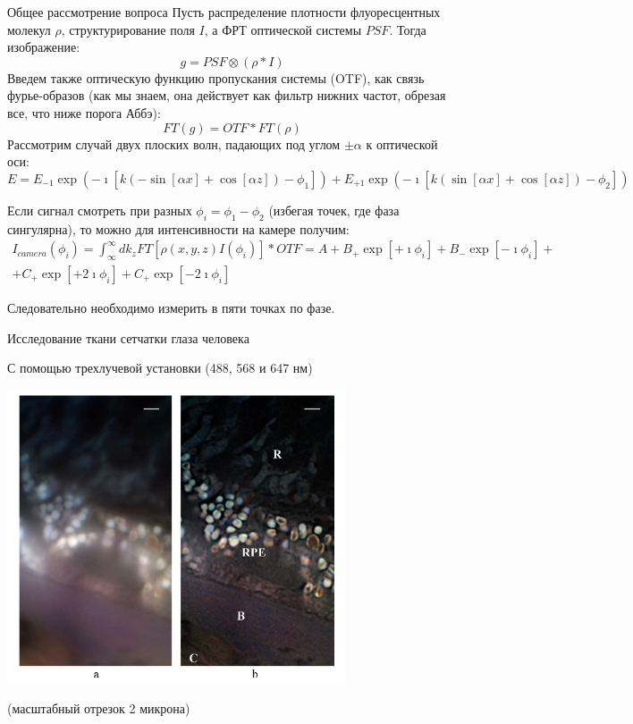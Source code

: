 \documentclass[9pt, compress, xcolor=table]{beamer}
\begin{document}
\begin{frame}{Общее рассмотрение вопроса}
{\small Пусть распределение плотности флуоресцентных молекул $\rho$, структурирование поля $I$, а ФРТ оптической системы $PSF$. Тогда изображение:}
\begin{equation*}
g=PSF\otimes(\rho*I)
\end{equation*}
{\small Введем также оптическую функцию пропускания системы (OTF), как связь фурье-образов (как мы знаем, она действует как фильтр нижних частот, обрезая все, что ниже порога Аббэ):}
\begin{equation*}
FT(g)=OTF* FT(\rho)
\end{equation*}
{\small Рассмотрим случай двух плоских волн, падающих под углом $\pm\alpha$ к оптической оси:}
\begin{equation*}
E=E_{-1}\exp (-\imath[k(-\sin[\alpha x]+\cos[\alpha z])-\phi_1])+E_{+1}\exp (-\imath[k(\sin[\alpha x]+\cos[\alpha z])-\phi_2])
\end{equation*}

Если сигнал смотреть при разных $\phi_i=\phi_1-\phi_2$ (избегая точек, где фаза сингулярна), то можно для интенсивности на камере получим:
\begin{multline*}
I_{camera}(\phi_i) = \int_{\infty}^{\infty}dk_z
 FT[\rho(x,y,z) I(\phi_i)]*OTF=A+B_{+}\exp[+\imath \phi_i]+B_{-}\exp[-\imath \phi_i]+\\+C_{+}\exp[+2\imath \phi_i]+C_{+}\exp[-2\imath \phi_i]\end{multline*}

Следовательно необходимо измерить в пяти точках по фазе.

\end{frame}

\begin{frame}{Исследование ткани сетчатки глаза человека}

С помощью трехлучевой установки (488, 568 и 647 нм)
\begin{center}
\includegraphics[width=0.75\textwidth]{sim11}
\end{center}
(масштабный отрезок 2 микрона)
\end{frame}
\end{document}
